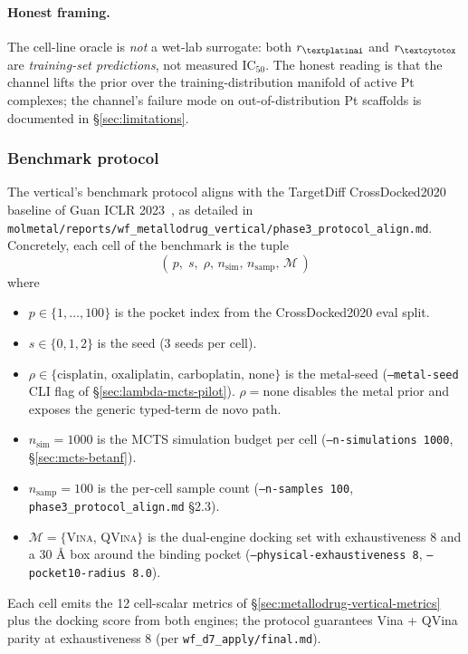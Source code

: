 \paragraph{Honest framing.}
The cell-line oracle is \emph{not} a wet-lab surrogate: both
$r_\textplatinai$ and $r_\textcytotox$ are \emph{training-set
predictions}, not measured IC$_{50}$. The honest reading is
that the channel lifts the prior over the training-distribution
manifold of active Pt complexes; the channel's failure mode on
out-of-distribution Pt scaffolds is documented in
\S\ref{sec:limitations}.

\subsubsection{Benchmark protocol}
\label{sec:metallodrug-vertical-protocol}

The vertical's benchmark protocol aligns with the TargetDiff
CrossDocked2020 baseline of Guan ICLR 2023~\cite{guan2023targetdiff},
as detailed in
\texttt{molmetal/reports/wf\_metallodrug\_vertical/phase3\_protocol\_align.md}.
Concretely, each cell of the benchmark is the tuple
\begin{equation}
  \label{eq:metallodrug-cell}
  (\,p,\; s,\; \rho,\, n_\text{sim},\, n_\text{samp},\, \mathcal{M}\,)
\end{equation}
where
\begin{itemize}
  \item $p \in \{1,\dots,100\}$ is the pocket index from the
        CrossDocked2020 eval split.
  \item $s \in \{0,1,2\}$ is the seed (3 seeds per cell).
  \item $\rho \in \{\text{cisplatin},\,
              \text{oxaliplatin},\,
              \text{carboplatin},\,
              \text{none}\}$ is the metal-seed
        (\texttt{--metal-seed} CLI flag of
        \S\ref{sec:lambda-mcts-pilot}). $\rho=\text{none}$
        disables the metal prior and exposes the generic
        typed-term de novo path.
  \item $n_\text{sim} = 1000$ is the MCTS simulation budget
        per cell (\texttt{--n-simulations 1000},
        \S\ref{sec:mcts-betanf}).
  \item $n_\text{samp} = 100$ is the per-cell sample count
        (\texttt{--n-samples 100},
        \texttt{phase3\_protocol\_align.md} \S2.3).
  \item $\mathcal{M} = \{$\textsc{Vina},
                        \textsc{QVina}$\}$ is the dual-engine
        docking set with exhaustiveness $8$ and a 30
        \AA{} box around the binding pocket
        (\texttt{--physical-exhaustiveness 8},
        \texttt{--pocket10-radius 8.0}).
\end{itemize}
Each cell emits the 12 cell-scalar metrics of
\S\ref{sec:metallodrug-vertical-metrics} plus the docking
score from both engines; the protocol guarantees Vina +
QVina parity at exhaustiveness 8 (per
\texttt{wf\_d7\_apply/final.md}).

